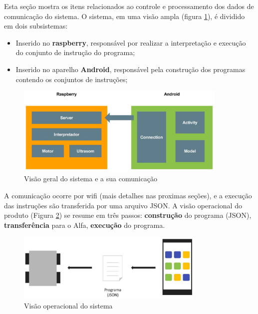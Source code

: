 Esta seção mostra os itens relacionados ao controle e processamento dos dados de comunicação do sistema. O sistema, em uma visão ampla
(figura \ref{fig:overview_down}), é dividido em dois subsistemas:

\begin{itemize}
\item Inserido no \textbf{raspberry}, responsável por realizar a interpretação e execução do conjunto de instrução do programa;
\item Inserido no aparelho \textbf{Android}, responsável pela construção dos programas contendo os conjuntos de instruções;
\end{itemize}

\begin{figure}[H]
    \centering
    \includegraphics[width=0.9\textwidth]{figuras/overview_down.eps}
    \caption{Visão geral do sistema e a sua comunicação}
    \label{fig:overview_down}
\end{figure}

A comunicação ocorre por wifi (mais detalhes nas proximas seções), e a execução das instruções são transferida por uma arquivo JSON.
A visão operacional do produto (Figura \ref{fig:overview}) se resume em três passos: \textbf{construção} do programa (JSON), \textbf{transferência}
para o Alfa, \textbf{execução} do programa.

\begin{figure}[H]
    \centering
    \includegraphics[width=0.8\textwidth]{figuras/overview.eps}
    \caption{Visão operacional do sistema}
    \label{fig:overview}
\end{figure}

